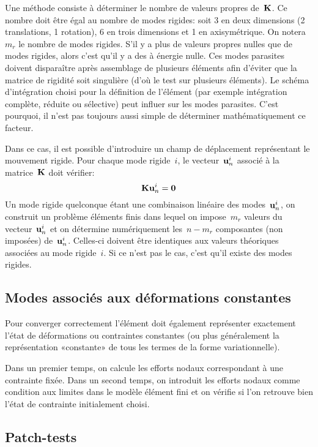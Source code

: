 \medskip
Une méthode consiste à déterminer le nombre de valeurs propres  de~$\MM{K}$. Ce nombre doit être égal au nombre de modes rigides: soit 3 en deux dimensions (2 translations, 1 rotation), 6 en trois dimensions et 1 en axisymétrique. On notera~$m_r$ le nombre de modes rigides. S'il y a plus de valeurs propres nulles que de modes rigides, alors c'est qu'il y a des  à énergie nulle. Ces modes parasites doivent disparaître après assemblage de plusieurs éléments afin d'éviter que la matrice de rigidité soit singulière (d'où le test sur plusieurs éléments). Le schéma d'intégration choisi pour la définition de l'élément (par exemple intégration complète, réduite ou sélective) peut influer sur les modes parasites. C'est pourquoi, il n'est pas toujours aussi simple de déterminer mathématiquement ce facteur.

\medskip
Dans ce cas, il est possible d'introduire un champ de déplacement représentant le mouvement rigide. Pour chaque mode rigide~$i$, le vecteur~$\VV{u}^i_n$ associé à la matrice~$\MM{K}$ doit vérifier:
\begin{equation}\MM{K}\VV{u}^i_n=\VV{0}\end{equation}
Un mode rigide quelconque étant une combinaison linéaire des modes~$\VV{u}^i_n$, on construit un problème éléments finis dans lequel on impose~$m_r$ valeurs du vecteur~$\VV{u}^i_n$ et on détermine numériquement les~$n-m_r$ composantes (non imposées) de~$\VV{u}^i_n$. Celles-ci doivent être identiques aux valeurs théoriques associées au mode rigide~$i$. Si ce n'est pas le cas, c'est qu'il existe des modes rigides.

\medskip
\subsection{Modes associés aux déformations constantes}

Pour converger correctement l'élément doit également représenter exactement l'état de déformations ou contraintes constantes (ou plus généralement la représentation «constante» de tous les termes de la forme variationnelle).

Dans un premier temps, on calcule les efforts nodaux correspondant à une contrainte fixée. Dans un second temps, on introduit les efforts nodaux comme condition aux limites dans le modèle élément fini et on vérifie si l'on retrouve bien l'état de contrainte initialement choisi.

\medskip
\subsection{Patch-tests}

